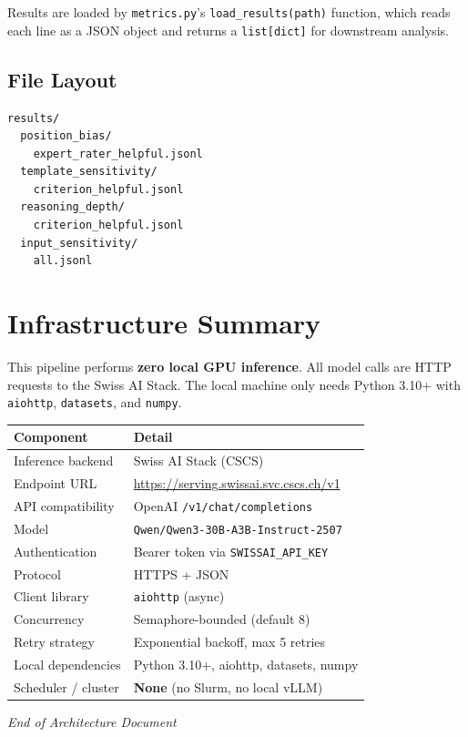 \documentclass[11pt,a4paper]{article}
\begin{document}
Results are loaded by \texttt{metrics.py}'s \texttt{load\_results(path)}
function, which reads each line as a JSON object and returns a
\texttt{list[dict]} for downstream analysis.

\subsection*{File Layout}

\begin{codebox}
\begin{lstlisting}
results/
  position_bias/
    expert_rater_helpful.jsonl
  template_sensitivity/
    criterion_helpful.jsonl
  reasoning_depth/
    criterion_helpful.jsonl
  input_sensitivity/
    all.jsonl
\end{lstlisting}
\end{codebox}


\newpage
\section{Infrastructure Summary}\label{sec:infra}

\begin{warnbox}
This pipeline performs \textbf{zero local GPU inference}. All model calls are
HTTP requests to the Swiss AI Stack. The local machine only needs Python 3.10+
with \texttt{aiohttp}, \texttt{datasets}, and \texttt{numpy}.
\end{warnbox}

\begin{center}
\small
\begin{tabular}{ll}
  \toprule
  \textbf{Component} & \textbf{Detail} \\
  \midrule
  Inference backend & Swiss AI Stack (CSCS) \\
  Endpoint URL & \url{https://serving.swissai.svc.cscs.ch/v1} \\
  API compatibility & OpenAI \texttt{/v1/chat/completions} \\
  Model & \texttt{Qwen/Qwen3-30B-A3B-Instruct-2507} \\
  Authentication & Bearer token via \texttt{SWISSAI\_API\_KEY} \\
  Protocol & HTTPS + JSON \\
  Client library & \texttt{aiohttp} (async) \\
  Concurrency & Semaphore-bounded (default 8) \\
  Retry strategy & Exponential backoff, max 5 retries \\
  Local dependencies & Python 3.10+, aiohttp, datasets, numpy \\
  Scheduler / cluster & \textbf{None} (no Slurm, no local vLLM) \\
  \bottomrule
\end{tabular}
\end{center}


\vfill
\begin{center}
\small\textit{End of Architecture Document}
\end{center}
\end{document}
